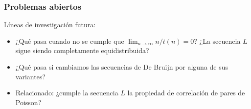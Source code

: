 \documentclass[t, 10pt, mathserif]{beamer}
\begin{document}

  





\begin{frame}
  \frametitle{Problemas abiertos}

  Líneas de investigación futura:
  \pause

  \begin{itemize}
    \item ¿Qué pasa cuando no se cumple que $\lim_{n \to \infty} n / t(n) = 0$? ¿La secuencia $L$ sigue siendo completamente equidistribuida? %
    \pause
    
    \item ¿Qué pasa si cambiamos las secuencias de De Bruijn por alguna de sus variantes?
    \pause

    \item Relacionado: ¿cumple la secuencia $L$ la propiedad de correlación de pares de Poisson?
  \end{itemize}
\end{frame}

\end{document}
